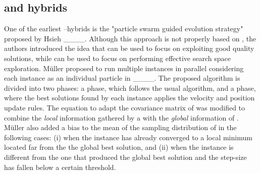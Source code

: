 \subsection{\PSO and \CMAES hybrids}
One of the earliest \PSO--\ESs hybrids is the "particle swarm guided evolution strategy" proposed by Hsieh \etal____.
Although this approach is not properly based on \CMAES, the authors introduced the idea that \ESs can be used to focus on exploiting good quality solutions, while \PSO can be used to focus on performing effective search space exploration.
%
Müller \etal proposed to run multiple \CMAES instances in parallel considering each instance as an individual particle in \PSO____.
The proposed algorithm is divided into two phases: a \CMAES phase, which follows the usual \CMAES algorithm, and a \PSO phase, where the best solutions found by each \CMAES instance applies the \stanPSO velocity and position update rules.
The equation to adapt the covariance matrix of \CMAES was modified to combine the \textit{local} information gathered by a \CMAES with the \textit{global} information of \PSO.
Müller \etal also added a bias to the mean of the sampling distribution of \CMAES in the following cases: (i) when the instance has already converged to a local minimum located far from the the global best solution, and (ii) when the instance is different from the one that produced the global best solution and the step-size has fallen below a certain threshold.
%
